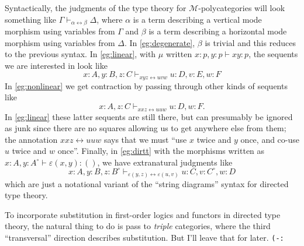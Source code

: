 \documentclass{article}
\theoremstyle{definition}
\def\M{\mathcal{M}}
\let\tot\leftrightarrow
\def\o{^{\circ}}
\begin{document}
Syntactically, the judgments of the type theory for $\M$-polycategories will look something like $\Gamma \vdash_{\alpha\tot\beta} \Delta$, where $\alpha$ is a term describing a vertical mode morphism using variables from $\Gamma$ and $\beta$ is a term describing a horizontal mode morphism using variables from $\Delta$.
In \cref{eg:degenerate}, $\beta$ is trivial and this reduces to the previous syntax.
In \cref{eg:linear}, with $\mu$ written $x:p,y:p \vdash xy:p$, the sequents we are interested in look like
\[ x:A, y:B, z:C \vdash_{xyz \tot uvw} u:D, v:E, w:F \]
In \cref{eg:nonlinear} we get contraction by passing through other kinds of sequents like
\[ x:A, z:C \vdash_{xxz \tot uuw} u:D, w:F. \]
In \cref{eg:linear} these latter sequents are still there, but can presumably be ignored as junk since there are no squares allowing us to get anywhere else from them; the annotation $xxz\tot uuw$ says that we must ``use $x$ twice and $y$ once, and co-use $u$ twice and $w$ once''.
Finally, in \cref{eg:dirtt} with the morphisms written as $x:A, y:A\o \vdash \varepsilon(x,y) : ()$, we have extranatural judgments like
\[ x:A, y:B, z:B\o \vdash_{\varepsilon(y,z) \tot \varepsilon(u,v)} u:C, v:C\o, w:D \]
which are just a notational variant of the ``string diagrams'' syntax for directed type theory.

To incorporate substitution in first-order logics and functors in directed type theory, the natural thing to do is pass to \emph{triple} categories, where the third ``transversal'' direction describes substitution.
But I'll leave that for later.  \texttt{(-:}
\end{document}
